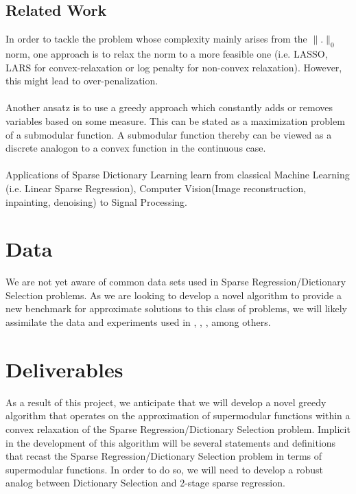 \documentclass{article}
\begin{document}
\subsection{Related Work}
In order to tackle the problem whose complexity mainly arises from the $\| .\|_0$ norm, one approach is to relax the norm to a more feasible one (i.e. LASSO, LARS for convex-relaxation or log penalty for non-convex relaxation). However, this might lead to over-penalization\cite{nonconvexrelax}.
\\
\\
Another ansatz is to use a greedy approach which constantly adds or removes variables based on some measure\cite{submod_spectral}.  This can be stated as a maximization problem of a submodular function. A submodular function thereby can be viewed as a discrete analogon to a convex function in the continuous case\cite{submod_sparsecoding}.
\\
\\
Applications of Sparse Dictionary Learning learn from classical Machine Learning (i.e. Linear Sparse Regression), Computer Vision(Image reconstruction, inpainting, denoising) to Signal Processing\cite{nonconvexrelax}\cite{submod_sparsecoding}.

\section{Data}
We are not yet aware of common data sets used in Sparse Regression/Dictionary Selection problems. As we are looking to develop a novel algorithm to provide a new benchmark for approximate solutions to this class of problems, we will likely assimilate the data and experiments used in  \cite{submod_spectral}, \cite{greedy_selection}, \cite{rIBP}, among others. 

\section{Deliverables} \label{methods}
As a result of this project, we anticipate that we will develop a novel greedy algorithm that operates on the approximation of supermodular functions within a convex relaxation of the Sparse Regression/Dictionary Selection problem. Implicit in the development of this algorithm will be several statements and definitions that recast the Sparse Regression/Dictionary Selection problem in terms of supermodular functions. In order to do so, we will need to develop a robust analog between Dictionary Selection and 2-stage sparse regression.
\end{document}
